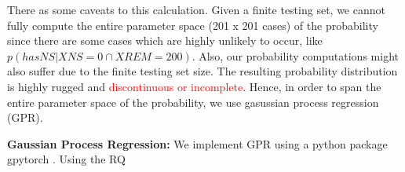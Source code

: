There as some caveats to this calculation. Given a finite testing set, we cannot fully compute the entire parameter space (201 x 201 cases) of the probability since there are some cases which are highly unlikely to occur, like $p(hasNS | XNS=0 \cap XREM=200)$. Also, our probability computations might also suffer due to the finite testing set size. The resulting probability distribution is highly rugged and \textcolor{red}{discontinuous or incomplete}. Hence, in order to span the entire parameter space of the probability, we use gasussian process regression (GPR). 

\textbf{Gaussian Process Regression:} We implement GPR using a python package gpytorch \cite{gpytorch}. Using the RQ




